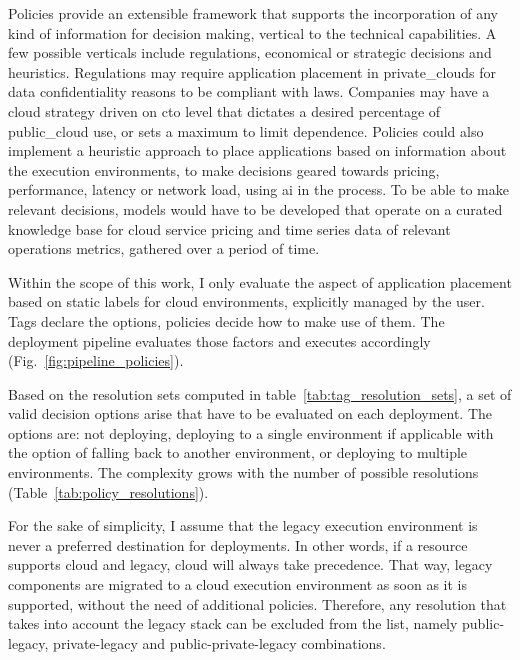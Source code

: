 \documentclass[../main.tex]{subfiles}
\begin{document}
    Policies provide an extensible framework that supports the incorporation of any kind of information for decision making, vertical to the technical capabilities.
    A few possible verticals include regulations, economical or strategic decisions and heuristics.
    Regulations may require application placement in \glspl{private_cloud} for data confidentiality reasons to be compliant with laws.
    Companies may have a \gls{cloud} strategy driven on \acrshort{cto} level that dictates a desired percentage of \gls{public_cloud} use, or sets a maximum to limit dependence.
    Policies could also implement a heuristic approach to place applications based on information about the execution environments, to make decisions geared towards pricing, performance, latency or network load, using \acrshort{ai} in the process.
    To be able to make relevant decisions, models would have to be developed that operate on a curated knowledge base for \gls{cloud} service pricing and time series data of relevant operations metrics, gathered over a period of time.

    Within the scope of this work, I only evaluate the aspect of application placement based on static labels for \gls{cloud} environments, explicitly managed by the user.
    Tags declare the options, policies decide how to make use of them.
    The deployment pipeline evaluates those factors and executes accordingly (Fig.~\ref{fig:pipeline_policies}).

    

    Based on the resolution sets computed in table~\ref{tab:tag_resolution_sets}, a set of valid decision options arise that have to be evaluated on each deployment.
    The options are: not deploying, deploying to a single environment if applicable with the option of falling back to another environment, or deploying to multiple environments.
    The complexity grows with the number of possible resolutions (Table~\ref{tab:policy_resolutions}).

    

    For the sake of simplicity, I assume that the legacy execution environment is never a preferred destination for deployments.
    In other words, if a resource supports \gls{cloud} and legacy, \gls{cloud} will always take precedence.
    That way, legacy components are migrated to a \gls{cloud} execution environment as soon as it is supported, without the need of additional policies.
    Therefore, any resolution that takes into account the legacy stack can be excluded from the list, namely public-legacy, private-legacy and public-private-legacy combinations.
\end{document}
